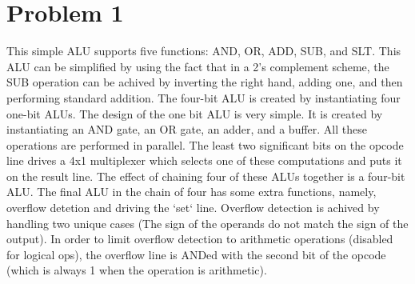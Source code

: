 \documentclass{article}
\newenvironment{problem}[1]{
  \nobreak\section*{Problem #1}
}{}
\begin{document}
  \begin{problem}{1}
    This simple ALU supports five functions: AND, OR, ADD, SUB, and SLT.  This
    ALU can be simplified by using the fact that in a 2's complement scheme, the
    SUB operation can be achived by inverting the right hand, adding one, and
    then performing standard addition.  The four-bit ALU is created by instantiating
    four one-bit ALUs.  The design of the one bit ALU is very simple.  It is created
    by instantiating an AND gate, an OR gate, an adder, and a buffer.  All these
    operations are performed in parallel.  The least two significant bits on the
    opcode line drives a 4x1 multiplexer which selects one of these computations
    and puts it on the result line.  The effect of chaining four of these ALUs
    together is a four-bit ALU.  The final ALU in the chain of four has some extra
    functions, namely, overflow detetion and driving the `set` line.  Overflow
    detection is achived by handling two unique cases (The sign of the operands do
    not match the sign of the output).  In order to limit overflow detection to
    arithmetic operations (disabled for logical ops), the overflow line is ANDed with
    the second bit of the opcode (which is always 1 when the operation is arithmetic).

    \begin{center}
      
    \end{center}


\end{problem}
\end{document}
